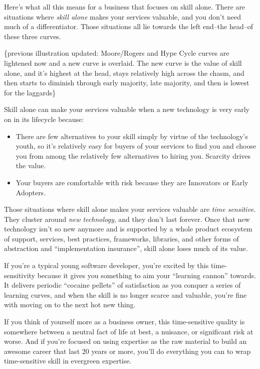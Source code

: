 Here's what all this means for a business that focuses on skill alone. There are situations where \emph{skill alone} makes your services valuable, and you don't need much of a differentiator. Those situations all lie towards the left end--the head--of these three curves.

\{previous illustration updated: Moore/Rogers and Hype Cycle curves are lightened now and a new curve is overlaid. The new curve is the value of skill alone, and it's highest at the head, stays relatively high across the chasm, and then starts to diminish through early majority, late majority, and then is lowest for the laggards\}

Skill alone can make your services valuable when a new technology is very early on in its lifecycle because:

\begin{itemize}
\item There are few alternatives to your skill simply by virtue of the technology's youth, so it's relatively easy for buyers of your services to find you and choose you from among the relatively few alternatives to hiring you. Scarcity drives the value.
\item Your buyers are comfortable with risk because they are Innovators or Early Adopters.
\end{itemize}

Those situations where skill alone makes your services valuable are \emph{time sensitive}. They cluster around \emph{new technology}, and they don't last forever. Once that new technology isn't so new anymore and is supported by a whole product ecosystem of support, services, best practices, frameworks, libraries, and other forms of abstraction and ``implementation insurance'', skill alone loses much of its value.

If you're a typical young software developer, you're excited by this time-sensitivity because it gives you something to aim your ``learning cannon'' towards. It delivers periodic ``cocaine pellets'' of satisfaction as you conquer a series of learning curves, and when the skill is no longer scarce and valuable, you're fine with moving on to the next hot new thing.

If you think of yourself more as a business owner, this time-sensitive quality is somewhere between a neutral fact of life at best, a nuisance, or significant risk at worse. And if you're focused on using expertise as the raw material to build an awesome career that last 20 years or more, you'll do everything you can to wrap time-sensitive skill in evergreen expertise.

